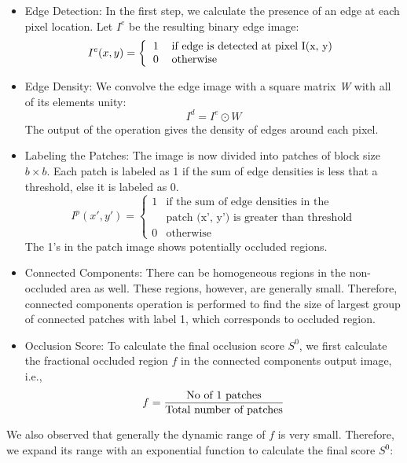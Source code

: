 \documentclass{sig-alternate}
\begin{document}
\begin{itemize}
    \item Edge Detection: In the first step, we calculate the presence of an edge at each pixel location. Let $I^{e}$ be the resulting binary edge image:
    \begin{equation}
        I^{e}(x,y)=\bigg\{\begin{tabular}{cl}1 & if edge is detected at pixel I(x, y)\\0 & otherwise\end{tabular}
    \end{equation}
    \item Edge Density: We convolve the edge image with a square matrix \textit{W} with all of its elements unity:
    \begin{equation}
        I^d=I^e\odot W
    \end{equation}
    The output of the operation gives the density of edges around each pixel.
    \item Labeling the Patches: The image is now divided into patches of block size $b \times b$. Each patch is labeled as 1 if the sum of edge densities is less that a threshold, else it is labeled as 0.
    \begin{equation}
        I^{p}(x',y')=\begin{cases}
      	1 & \text{if the sum of edge 		densities in the}\\ & \text{patch (x', y') is greater than threshold}\\0 & 		\text{otherwise}\end{cases}
    \end{equation}
    The 1’s in the patch image shows potentially occluded regions.
    \item Connected Components: There can be homogeneous regions in the non-occluded area as well. These regions, however, are generally small. Therefore, connected components operation is performed to find the size of largest group of connected patches with label 1, which corresponds to occluded region.
    \item Occlusion Score: To calculate the final occlusion score $S^0$, we first calculate the fractional occluded region $f$ in the connected components output image, i.e.,
    \begin{equation}
        f=\frac{\textnormal{No of 1 patches}}{\textnormal{Total number of patches}}
    \end{equation}
\end{itemize}
We also observed that generally the dynamic range of $f$ is very small. Therefore, we expand its range with an exponential function to calculate the final score $S^0$:
\end{document}
